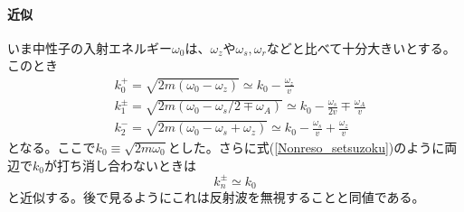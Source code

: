 \paragraph{近似}
いま中性子の入射エネルギー$\omega_0$は、$\omega_z$や$\omega_s,\omega_r$などと比べて十分大きいとする。このとき
\begin{align}
&k_0^+ =\sqrt{2m(\omega_0 -\omega_z)} \simeq k_0 -\frac{\omega_z}{v} \label{Nonreso_k0+} \\
&k_1^{\pm} = \sqrt{2m(\omega_0-\omega_s/2 \mp \omega_A)} \simeq k_0 -\frac{\omega_s}{2v} \mp \frac{\omega_A}{v} \label{Nonreso_k1+-} \\
&k_2^- =\sqrt{2m(\omega_0 -\omega_s +\omega_z)} \simeq k_0 -\frac{\omega_s}{v} +\frac{\omega_z}{v}\label{Nonreso_k2-}
\end{align}
となる。ここで$k_0 \equiv \sqrt{2m\omega_0}$とした。さらに式(\ref{Nonreso_setsuzoku})のように両辺で$k_0$が打ち消し合わないときは
\begin{equation}
k_n^\pm \simeq k_0\label{Nonreso_kn+-}
\end{equation}
と近似する。後で見るようにこれは反射波を無視することと同値である。

